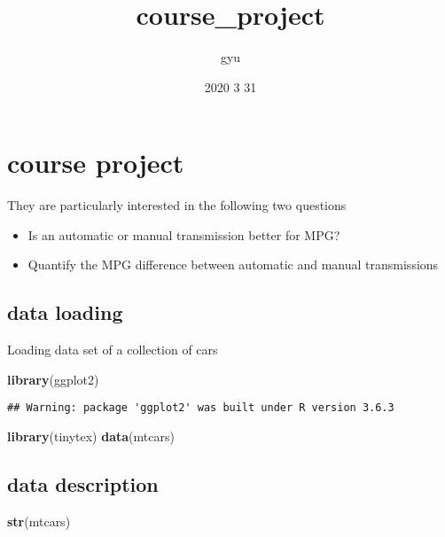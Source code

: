\documentclass[
]{article}
\title{course\_project}
\author{gyu}
\date{2020 3 31}
\newenvironment{Shaded}{\begin{snugshade}}{\end{snugshade}}
\newcommand{\KeywordTok}[1]{\textcolor[rgb]{0.13,0.29,0.53}{\textbf{#1}}}
\newcommand{\NormalTok}[1]{#1}
\providecommand{\tightlist}{%
  \setlength{\itemsep}{0pt}\setlength{\parskip}{0pt}}
\begin{document}
\maketitle

\hypertarget{course-project}{%
\section{course project}\label{course-project}}

They are particularly interested in the following two questions

\begin{itemize}
\tightlist
\item
  Is an automatic or manual transmission better for MPG?
\item
  Quantify the MPG difference between automatic and manual transmissions
\end{itemize}

\hypertarget{data-loading}{%
\subsection{data loading}\label{data-loading}}

Loading data set of a collection of cars

\begin{Shaded}
\begin{Highlighting}[]
\KeywordTok{library}\NormalTok{(ggplot2)}
\end{Highlighting}
\end{Shaded}

\begin{verbatim}
## Warning: package 'ggplot2' was built under R version 3.6.3
\end{verbatim}

\begin{Shaded}
\begin{Highlighting}[]
\KeywordTok{library}\NormalTok{(tinytex)}
\KeywordTok{data}\NormalTok{(mtcars)}
\end{Highlighting}
\end{Shaded}

\hypertarget{data-description}{%
\subsection{data description}\label{data-description}}

\begin{Shaded}
\begin{Highlighting}[]
\KeywordTok{str}\NormalTok{(mtcars)}
\end{Highlighting}
\end{Shaded}
\end{document}
